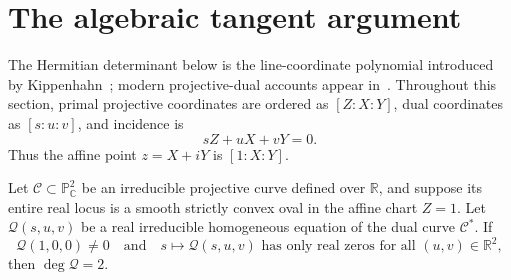\documentclass[preprints,article,submit,oneauthor]{Definitions/mdpi}
\numberwithin{equation}{section}
\newcommand{\C}{\mathbb C}
\newcommand{\R}{\mathbb R}
\begin{document}
\section{The algebraic tangent argument}

The Hermitian determinant below is the line-coordinate polynomial introduced
by Kippenhahn~\cite{Kippenhahn2008}; modern projective-dual
accounts appear in~\cite{PlaumannSinnWeis2021}.  Throughout this section,
primal projective coordinates are ordered as \([Z:X:Y]\), dual coordinates as
\([s:u:v]\), and incidence is
\[
 sZ+uX+vY=0.
\]
Thus the affine point \(z=X+iY\) is \([1:X:Y]\).

\begin{Proposition}
\label{prop:generic-contact}
Let \(\mathscr C\subset\mathbb P^2_\C\) be an irreducible projective curve
defined over \(\R\), and suppose its entire real locus is a smooth strictly
convex oval in the affine chart \(Z=1\).  Let
\(\mathscr Q(s,u,v)\) be a real irreducible homogeneous equation of the dual
curve \(\mathscr C^*\).  If
\[
 \mathscr Q(1,0,0)\neq0
 \quad\text{and}\quad
 s\longmapsto\mathscr Q(s,u,v)
 \text{ has only real zeros for all }(u,v)\in\R^2,
\]
then \(\deg\mathscr Q=2\).
\end{Proposition}
\end{document}
